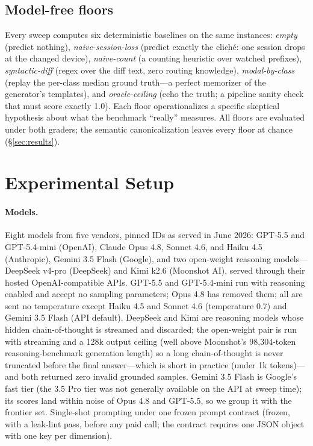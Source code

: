 \documentclass[11pt]{article}
\begin{document}
\subsection{Model-free floors}
\label{sec:floors}

Every sweep computes six deterministic baselines on the same instances:
\emph{empty} (predict nothing), \emph{naive-session-loss} (predict exactly
the clich\'e: one session drops at the changed device), \emph{naive-count}
(a counting heuristic over watched prefixes), \emph{syntactic-diff} (regex
over the diff text, zero routing knowledge), \emph{modal-by-class} (replay
the per-class median ground truth---a perfect memorizer of the generator's
templates), and \emph{oracle-ceiling} (echo the truth; a pipeline sanity
check that must score exactly 1.0). Each floor operationalizes a specific
skeptical hypothesis about what the benchmark ``really'' measures. All
floors are evaluated under both graders; the semantic canonicalization
leaves every floor at chance (\S\ref{sec:results}).

\section{Experimental Setup}
\label{sec:setup}

\paragraph{Models.} Eight models from five vendors, pinned IDs as served in
June 2026: GPT-5.5 and GPT-5.4-mini (OpenAI), Claude Opus 4.8, Sonnet 4.6,
and Haiku 4.5 (Anthropic), Gemini 3.5 Flash (Google), and two open-weight
reasoning models---DeepSeek v4-pro (DeepSeek) and Kimi k2.6 (Moonshot AI),
served through their hosted OpenAI-compatible APIs. GPT-5.5 and
GPT-5.4-mini run with reasoning enabled and accept no sampling parameters;
Opus 4.8 has removed them; all are sent no temperature except Haiku 4.5 and
Sonnet 4.6 (temperature 0.7) and Gemini 3.5 Flash (API default). DeepSeek and
Kimi are reasoning models whose hidden chain-of-thought is streamed and
discarded; the open-weight pair is run with streaming and a 128k output
ceiling (well above Moonshot's 98{,}304-token reasoning-benchmark generation
length) so a long chain-of-thought is never truncated before the final
answer---which is short in practice (under 1k tokens)---and both returned zero
invalid grounded samples.
Gemini 3.5 Flash is Google's fast tier (the 3.5
Pro tier was not generally available on the API at sweep time); its scores
land within noise of Opus 4.8 and GPT-5.5, so we group it with the frontier
set. Single-shot prompting under one frozen prompt contract (frozen, with a
leak-lint pass, before any paid call; the contract requires one JSON object
with one key per dimension).
\end{document}
